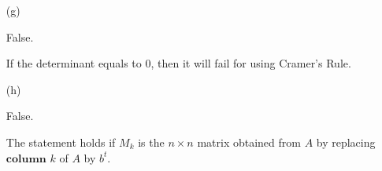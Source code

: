 \begin{Exercise}
\begin{enumerate}[(a)]
		\item[(g)]
		\begin{answer}
			False.
		\end{answer}
		\begin{solution}
			If the determinant equals to $0$, then it will fail for using Cramer's Rule.
		\end{solution}
		
		\item[(h)]
		\begin{answer}
			False.
		\end{answer}
		\begin{solution}
			The statement holds if $M_k$ is the $n\times n$ matrix obtained from $A$ by replacing $\mathbf{column}$ $k$ of $A$ by $b^t$.
		\end{solution}
		
	\end{enumerate}
\end{Exercise}